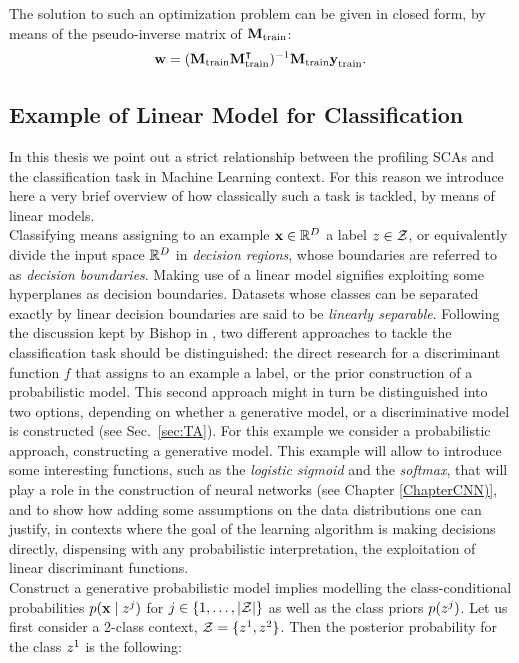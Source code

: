  The solution to such an optimization problem can be given in closed form, by means of the pseudo-inverse matrix of $\textbf{M}_{\text{train}}$:
\begin{equation}
\textbf{w} = (\textbf{M}_{\text{train}}\textbf{M}_{\text{train}}^\intercal)^{-1}\textbf{M}_{\text{train}}\textbf{y}_{\text{train}}.
\end{equation}


\subsection{Example of Linear Model for Classification}\label{example:LDA}
In this thesis we point out a strict relationship between the profiling SCAs and the classification task in Machine Learning context. For this reason we introduce here a very brief overview of how classically such a task is tackled, by means of linear models. \\
Classifying means assigning to an example $\textbf{x}\in\mathbb{R}^D$ a label $z\in \mathcal{Z}$, or equivalently divide the input space $\mathbb{R}^D$ in \emph{decision regions}, whose boundaries are referred to as \emph{decision boundaries}. Making use of a linear model signifies exploiting some hyperplanes as decision boundaries. Datasets whose classes can be separated exactly by linear decision boundaries are said to be \emph{linearly separable}. Following the discussion kept by Bishop in \cite{christopher2006pattern}, two different approaches to tackle the classification task should be distinguished: the direct research for a discriminant function $f$ that assigns to an example a label, or the prior construction of a probabilistic model. This second approach might in turn be distinguished into two options, depending on whether a generative model, or a discriminative model is constructed (see Sec.~\ref{sec:TA}). For this example we consider a probabilistic approach, constructing a generative model. This example will allow to introduce some interesting functions, such as the \emph{logistic sigmoid} and the \emph{softmax}, that will play a role in the construction of neural networks (see Chapter \ref{ChapterCNN)}, and to show how adding some assumptions on the data distributions one can justify, in contexts where the goal of the learning algorithm is making decisions directly, dispensing with any probabilistic interpretation, the exploitation of linear discriminant functions. \\
Construct a generative probabilistic model implies modelling the class-conditional probabilities $p(\textbf{x}\mid z^j)$ for $j\in \{1,\dots,\lvert\mathcal{Z}\rvert\}$ as well as the class priors $p(z^j)$. Let us first consider a 2-class context, \ie $\mathcal{Z} = \{z^1, z^2\}$. Then the posterior probability for the class $z^1$ is the following:
